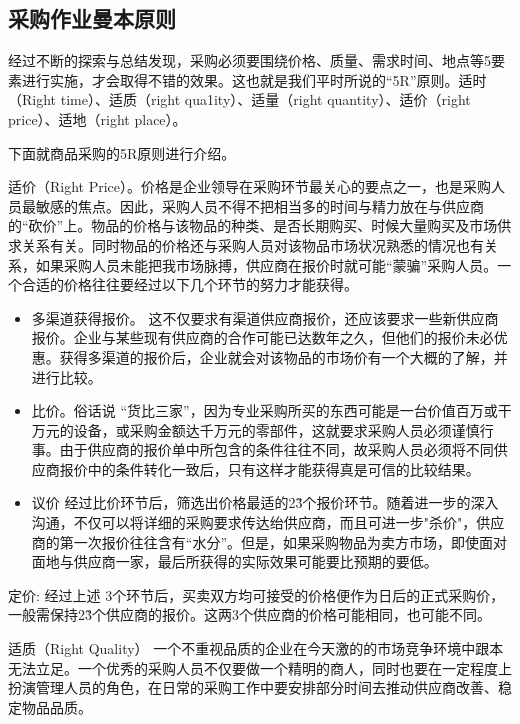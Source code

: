 \subsection {采购作业曼本原则}

    经过不断的探索与总结发现，采购必须要围绕价格、质量、需求时间、地点等5要素进行实施，才会取得不错的效果。这也就是我们平时所说的“5R”原则。适时（Right time）、适质（right qua1ity）、适量（right quantity）、适价（right price）、适地（right place）。

    下面就商品采购的5R原则进行介绍。

    \begin{enumerate.zh}
        \item 适价（Right Price）。价格是企业领导在采购环节最关心的要点之一，也是采购人员最敏感的焦点。因此，采购人员不得不把相当多的时间与精力放在与供应商的“砍价”上。物品的价格与该物品的种类、是否长期购买、时候大量购买及市场供求关系有关。同时物品的价格还与采购人员对该物品市场状况熟悉的情况也有关系，如果采购人员未能把我市场脉搏，供应商在报价时就可能“蒙骗”采购人员。一个合适的价格往往要经过以下几个环节的努力才能获得。
        \begin{itemize}
            \item 多渠道获得报价。 这不仅要求有渠道供应商报价，还应该要求一些新供应商报价。企业与某些现有供应商的合作可能已达数年之久，但他们的报价未必优惠。获得多渠道的报价后，企业就会对该物品的市场价有一个大概的了解，并进行比较。

            \item 比价。俗话说 “货比三家”，因为专业采购所买的东西可能是一台价值百万或干万元的设备，或采购金额达千万元的零部件，这就要求采购人员必须谨慎行事。由于供应商的报价单中所包含的条件往往不同，故采购人员必须将不同供应商报价中的条件转化一致后，只有这样才能获得真是可信的比较结果。

            \item 议价 经过比价环节后，筛选出价格最适的2\~3个报价环节。随着进一步的深入沟通，不仅可以将详细的采购要求传达绐供应商，而且可进一步"杀价"，供应商的第一次报价往往含有“水分”。但是，如果采购物品为卖方市场，即使面对面地与供应商一家，最后所获得的实际效果可能要比预期的要低。
        \end{itemize}
    \item 定价: 经过上述 3个环节后，买卖双方均可接受的价格便作为日后的正式采购价，一般需保持2\~3个供应商的报价。这两3个供应商的价格可能相同，也可能不同。

    \item 适质（Right Quality） 一个不重视品质的企业在今天激的的市场竞争环境中跟本无法立足。一个优秀的采购人员不仅要做一个精明的商人，同时也要在一定程度上扮演管理人员的角色，在日常的采购工作中要安排部分时间去推动供应商改善、稳定物品品质。


\end{enumerate.zh}
